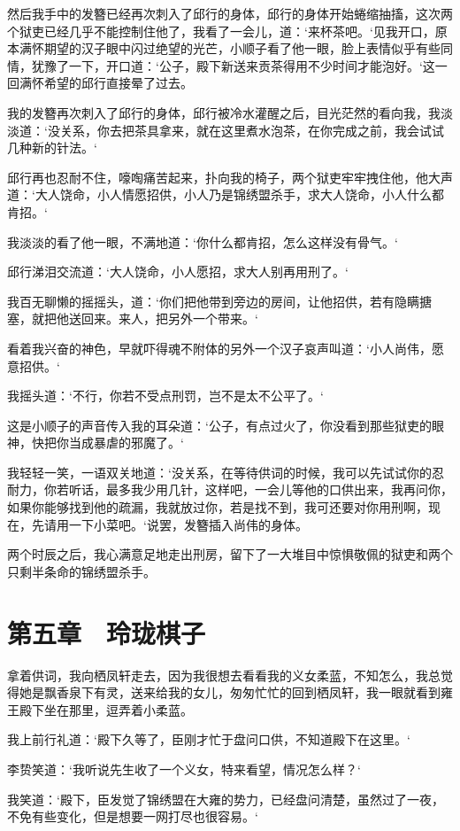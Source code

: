 然后我手中的发簪已经再次刺入了邱行的身体，邱行的身体开始蜷缩抽搐，这次两个狱吏已经几乎不能控制住他了，我看了一会儿，道：‘来杯茶吧。‘见我开口，原本满怀期望的汉子眼中闪过绝望的光芒，小顺子看了他一眼，脸上表情似乎有些同情，犹豫了一下，开口道：‘公子，殿下新送来贡茶得用不少时间才能泡好。‘这一回满怀希望的邱行直接晕了过去。

我的发簪再次刺入了邱行的身体，邱行被冷水灌醒之后，目光茫然的看向我，我淡淡道：‘没关系，你去把茶具拿来，就在这里煮水泡茶，在你完成之前，我会试试几种新的针法。‘

邱行再也忍耐不住，嚎啕痛苦起来，扑向我的椅子，两个狱吏牢牢拽住他，他大声道：‘大人饶命，小人情愿招供，小人乃是锦绣盟杀手，求大人饶命，小人什么都肯招。‘

我淡淡的看了他一眼，不满地道：‘你什么都肯招，怎么这样没有骨气。‘

邱行涕泪交流道：‘大人饶命，小人愿招，求大人别再用刑了。‘

我百无聊懒的摇摇头，道：‘你们把他带到旁边的房间，让他招供，若有隐瞒搪塞，就把他送回来。来人，把另外一个带来。‘

看着我兴奋的神色，早就吓得魂不附体的另外一个汉子哀声叫道：‘小人尚伟，愿意招供。‘

我摇头道：‘不行，你若不受点刑罚，岂不是太不公平了。‘

这是小顺子的声音传入我的耳朵道：‘公子，有点过火了，你没看到那些狱吏的眼神，快把你当成暴虐的邪魔了。‘

我轻轻一笑，一语双关地道：‘没关系，在等待供词的时候，我可以先试试你的忍耐力，你若听话，最多我少用几针，这样吧，一会儿等他的口供出来，我再问你，如果你能够找到他的疏漏，我就放过你，若是找不到，我可还要对你用刑啊，现在，先请用一下小菜吧。‘说罢，发簪插入尚伟的身体。

两个时辰之后，我心满意足地走出刑房，留下了一大堆目中惊惧敬佩的狱吏和两个只剩半条命的锦绣盟杀手。

\chapter{第五章　玲珑棋子}

拿着供词，我向栖凤轩走去，因为我很想去看看我的义女柔蓝，不知怎么，我总觉得她是飘香泉下有灵，送来给我的女儿，匆匆忙忙的回到栖凤轩，我一眼就看到雍王殿下坐在那里，逗弄着小柔蓝。

我上前行礼道：‘殿下久等了，臣刚才忙于盘问口供，不知道殿下在这里。‘

李贽笑道：‘我听说先生收了一个义女，特来看望，情况怎么样？‘

我笑道：‘殿下，臣发觉了锦绣盟在大雍的势力，已经盘问清楚，虽然过了一夜，不免有些变化，但是想要一网打尽也很容易。‘

